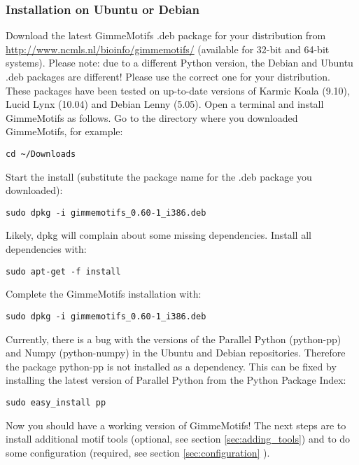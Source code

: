 \documentclass[11pt]{article}
\begin{document}
\subsubsection{Installation on Ubuntu or Debian}
Download the latest GimmeMotifs .deb package for your distribution  from \url{http://www.ncmls.nl/bioinfo/gimmemotifs/} (available for 32-bit and 64-bit systems). Please note: due to a different Python version, the Debian and Ubuntu .deb packages are different! Please use the correct one for your distribution.
These packages have been tested on up-to-date versions of Karmic Koala (9.10), Lucid Lynx (10.04) and Debian Lenny (5.05). 
Open a terminal and install GimmeMotifs as follows. Go to the directory where you downloaded GimmeMotifs, for example:
\begin{verbatim}
cd ~/Downloads
\end{verbatim}
Start the install (substitute the package name for the .deb package you downloaded):
\begin{verbatim}
sudo dpkg -i gimmemotifs_0.60-1_i386.deb 
\end{verbatim}
Likely, dpkg will complain about some missing dependencies. Install all dependencies with:
\begin{verbatim}
sudo apt-get -f install
\end{verbatim}
Complete the GimmeMotifs installation with:
\begin{verbatim}
sudo dpkg -i gimmemotifs_0.60-1_i386.deb 
\end{verbatim}
Currently, there is a bug with the versions of the Parallel Python (python-pp) and Numpy (python-numpy) in the Ubuntu and Debian repositories. Therefore the package python-pp is not installed as a dependency. This can be fixed by installing the latest version of Parallel Python from the Python Package Index:
\begin{verbatim}
sudo easy_install pp 
\end{verbatim}
Now you should have a working version of GimmeMotifs! The next steps are to install additional motif tools (optional, see section \ref{sec:adding_tools}) and to do some configuration (required, see section \ref{sec:configuration} ).
\end{document}
